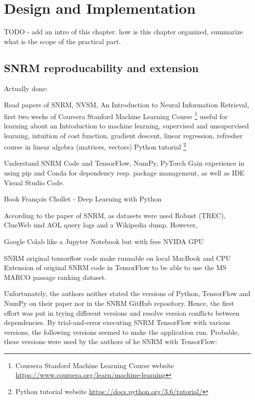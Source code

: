 \chapter{Design and Implementation}


TODO - add an intro of this chapter. 
how is this chapter organized,
summarize what is the scope of the practical part.




\section{SNRM reproducability and extension}
Actually done:

Read papers of SNRM, NVSM, An Introduction to Neural Information Retrieval,
first two weeks of Coursera Stanford Machine Learning Course \footnote{Coursera Stanford Machine Learning Course website \url{https://www.coursera.org/learn/machine-learning}}
useful for learning about an Introduction to machine learning, supervised and unsupervised learning, intuition of
cost function, gradient descent, linear regression, refresher course in linear algebra (matrices, vectors)
Python tutorial \footnote{Python tutorial website \url{https://docs.python.org/3.6/tutorial/}}

Understand SNRM Code and TensorFlow, NumPy, PyTorch
Gain experience in using pip and Conda for dependency resp. package management, as well as IDE Visual Studio Code.


Book François Chollet - Deep Learning with Python

According to the paper of SNRM, as datasets were used Robust (TREC), ClueWeb und AOL query logs and a Wikipedia dump.
However, 



Google Colab like a Jupyter Notebook but with free NVIDA GPU

SNRM original tensorflow code make runnable on local MacBook and CPU
Extension of original SNRM code in TensorFlow to be able to use the MS MARCO passage ranking dataset.

Unfortunately, the authors neither stated the versions of Python, TensorFlow and NumPy on their paper nor in the SNRM GitHub repository.
Hence, the first effort was put in trying different versions and resolve version conflicts between dependencies.
By trial-and-error executing SNRM TensorFlow with various versions, the following versions seemed to make the application run.
Probable, these versions were used by the authors of he SNRM with TensorFlow:

